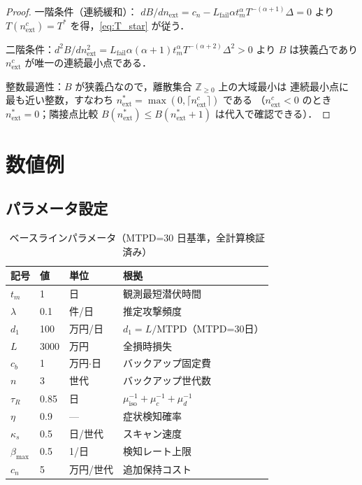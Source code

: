 \documentclass[12pt,a4paper]{article}
\theoremstyle{plain}
\theoremstyle{definition}
\theoremstyle{remark}
\newcommand{\Z}{\mathbb{Z}}
\begin{document}
\begin{proof}
一階条件（連続緩和）：
$dB/dn_{\mathrm{ext}}=c_n-L_{\mathrm{fail}}\alpha t_m^\alpha T^{-(\alpha+1)}\Delta=0$
より $T(n_{\mathrm{ext}}^c)=T^*$ を得，\eqref{eq:T_star} が従う．

二階条件：$d^2B/dn_{\mathrm{ext}}^2=L_{\mathrm{fail}}\alpha(\alpha+1)t_m^\alpha T^{-(\alpha+2)}\Delta^2>0$
より $B$ は狭義凸であり $n_{\mathrm{ext}}^c$ が唯一の連続最小点である．

整数最適性：$B$ が狭義凸なので，離散集合 $\Z_{\ge0}$ 上の大域最小は
連続最小点に最も近い整数，すなわち $n_{\mathrm{ext}}^*=\max(0,\lceil n_{\mathrm{ext}}^c\rceil)$ である
（$n_{\mathrm{ext}}^c<0$ のとき $n_{\mathrm{ext}}^*=0$；隣接点比較 $B(n_{\mathrm{ext}}^*)\le B(n_{\mathrm{ext}}^*+1)$ は代入で確認できる）．
\end{proof}

\section{数値例}
\label{sec:numerical}

\subsection{パラメータ設定}

\begin{table}[h]
\centering\small
\caption{ベースラインパラメータ（MTPD=30 日基準，全計算検証済み）}
\label{tab:params}
\begin{tabular}{@{}lll p{60mm}@{}}
\toprule
記号 & 値 & 単位 & 根拠 \\
\midrule
$t_m$ & 1 & 日 & 観測最短潜伏時間~\cite{mandiant2023} \\
$\lambda$ & 0.1 & 件/日 & 推定攻撃頻度 \\
$d_1$ & 100 & 万円/日 & $d_1=L/\mathrm{MTPD}$（MTPD=30日）\\
$L$ & 3000 & 万円 & 全損時損失 \\
$c_b$ & 1 & 万円$\cdot$日 & バックアップ固定費 \\
$n$ & 3 & 世代 & バックアップ世代数 \\
$\tau_R$ & 0.85 & 日 & $\mu_{\mathrm{iso}}^{-1}+\mu_c^{-1}+\mu_d^{-1}$ \\
$\eta$ & 0.9 & --- & 症状検知確率 \\
$\kappa_s$ & 0.5 & 日/世代 & スキャン速度 \\
$\beta_{\max}$ & 0.5 & 1/日 & 検知レート上限 \\
$c_n$ & 5 & 万円/世代 & 追加保持コスト \\
\bottomrule
\end{tabular}
\end{table}
\end{document}
